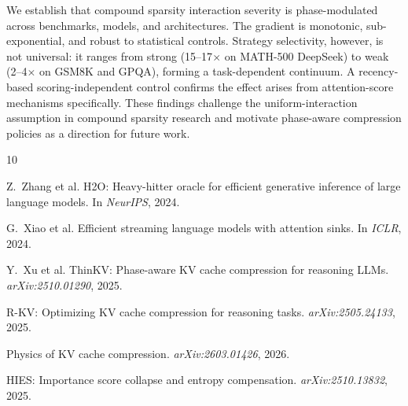 \documentclass[11pt,a4paper]{article}
\begin{document}
We establish that compound sparsity interaction severity is phase-modulated across benchmarks, models, and architectures. The gradient is monotonic, sub-exponential, and robust to statistical controls. Strategy selectivity, however, is not universal: it ranges from strong (15--17$\times$ on MATH-500 DeepSeek) to weak (2--4$\times$ on GSM8K and GPQA), forming a task-dependent continuum. A recency-based scoring-independent control confirms the effect arises from attention-score mechanisms specifically. These findings challenge the uniform-interaction assumption in compound sparsity research and motivate phase-aware compression policies as a direction for future work.

\begin{thebibliography}{10}

Z.~Zhang et al.
\newblock H2O: Heavy-hitter oracle for efficient generative inference of large language models.
\newblock In \emph{NeurIPS}, 2024.

G.~Xiao et al.
\newblock Efficient streaming language models with attention sinks.
\newblock In \emph{ICLR}, 2024.

Y.~Xu et al.
\newblock ThinKV: Phase-aware KV cache compression for reasoning LLMs.
\newblock \emph{arXiv:2510.01290}, 2025.

R-KV: Optimizing KV cache compression for reasoning tasks.
\newblock \emph{arXiv:2505.24133}, 2025.

Physics of KV cache compression.
\newblock \emph{arXiv:2603.01426}, 2026.

HIES: Importance score collapse and entropy compensation.
\newblock \emph{arXiv:2510.13832}, 2025.

\end{thebibliography}
\end{document}
